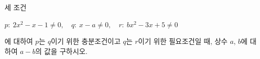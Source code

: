 세 조건 \begin{center}$p:\ 2x^2-x-1\ne 0,\quad q:\ x-a\ne 0,\quad r:\ bx^2-3x+5\ne 0$\end{center} 에 대하여 $p$는 $q$이기 위한 충분조건이고 $q$는 $r$이기 위한 필요조건일 때, 상수 $a$, $b$에 대하여 $a-b$의 값을 구하시오. 
